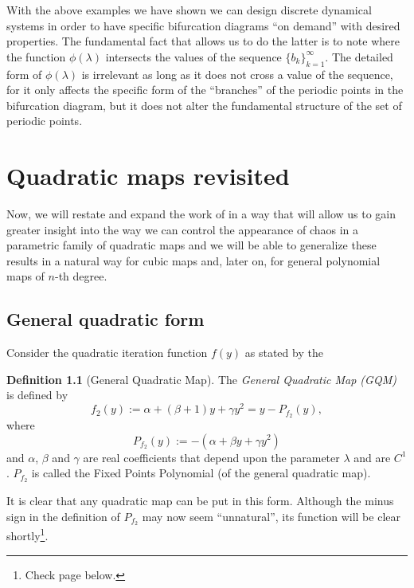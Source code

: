 \documentclass[10pt,twoside,titlepage]{book}
\numberwithin{equation}{chapter}
\numberwithin{figure}{chapter}
\numberwithin{table}{chapter}
\theoremstyle{plain}%
\theoremstyle{definition}
\newtheorem{defn}{Definition}[chapter]
\theoremstyle{remark}
\begin{document}
With the above examples we have shown we can design discrete dynamical systems in order to have specific bifurcation diagrams ``on demand'' with desired properties. The fundamental fact that allows us to do the latter is to note where the function $\phi(\lambda)$ intersects the values of the sequence $\{b_k\}_{k=1}^{\infty}$. The detailed form of $\phi(\lambda)$ is irrelevant as long as it does not cross a value of the sequence, for it only affects the specific form of the ``branches'' of the periodic points in the bifurcation diagram, but it does not alter the fundamental structure of the set of periodic points.

\chapter{Quadratic maps revisited}
\label{cha:QuadRev}

Now, we will restate and expand the work of \cite{Solis2004} in a way that will allow us to gain greater insight into the way we can control the appearance of chaos in a parametric family of quadratic maps and we will be able to generalize these results in a natural way for cubic maps and, later on, for general polynomial maps of $n$-th degree.

\section{General quadratic form}
\label{sub:GeneralQuadraticForm}
Consider the quadratic iteration function $f(y)$ as stated by the

\begin{defn}[General Quadratic Map]
	\label{def:GQM}
	The \emph{General Quadratic Map (GQM)} is defined by
	\begin{equation}
		f_2(y) := \alpha+(\beta+1)y+\gamma y^2 = y - P_{f_2}(y),
	\end{equation}
	where
	\begin{equation}
		P_{f_2}(y):=-(\alpha+\beta y+\gamma y^2)
	\end{equation}
	and $\alpha$, $\beta$ and $\gamma$ are real coefficients that depend upon the parameter $\lambda$ and are $C^1$. $P_{f_2}$ is called the Fixed Points Polynomial (of the general quadratic map).
\end{defn}

It is clear that any quadratic map can be put in this form. Although the minus sign in the definition of $P_{f_2}$ may now seem ``unnatural'', its function will be clear shortly\footnote{Check page \pageref{minus_sign} below.}.
\end{document}
